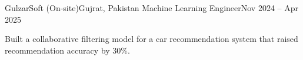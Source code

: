 \resumeSubheading
{GulzarSoft (On-site)}{Gujrat, Pakistan}
{Machine Learning Engineer}{Nov 2024 -- Apr 2025}
\resumeItemListStart
    \item \small{Built a collaborative filtering model for a car recommendation system that raised recommendation accuracy by 30\%.}
\resumeItemListEnd
